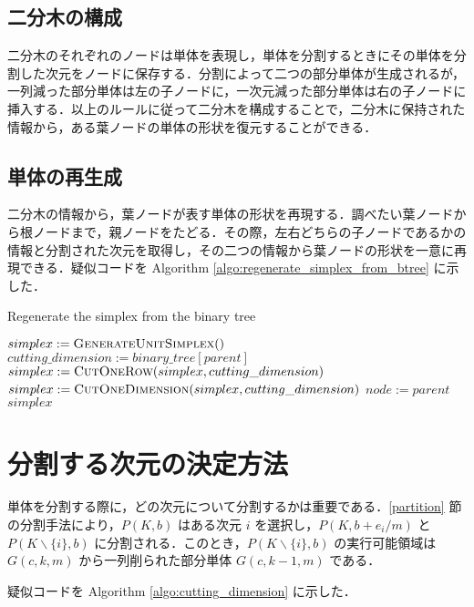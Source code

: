 \documentclass[a4paper,11pt]{jreport}
\begin{document}
\subsection{二分木の構成}

二分木のそれぞれのノードは単体を表現し，単体を分割するときにその単体を分割した次元をノードに保存する．分割によって二つの部分単体が生成されるが，一列減った部分単体は左の子ノードに，一次元減った部分単体は右の子ノードに挿入する．以上のルールに従って二分木を構成することで，二分木に保持された情報から，ある葉ノードの単体の形状を復元することができる．\par

\subsection{単体の再生成}

二分木の情報から，葉ノードが表す単体の形状を再現する．調べたい葉ノードから根ノードまで，親ノードをたどる．その際，左右どちらの子ノードであるかの情報と分割された次元を取得し，その二つの情報から葉ノードの形状を一意に再現できる．疑似コードを Algorithm \ref{algo:regenerate_simplex_from_btree} に示した．\par

\begin{algorithm}
\caption{Regenerate the simplex from the binary tree}
\label{algo:regenerate_simplex_from_btree}
\begin{algorithmic}[1]
\State $ simplex := \Call{GenerateUnitSimplex} $
\State $ cutting\_dimension := binary\_tree[parent] $
\State $ simplex := \Call{CutOneRow}{simplex, cutting\_dimension} $
\State $ simplex := \Call{CutOneDimension}{simplex,  cutting\_dimension} $
\EndIf
\State $ node := parent $
\EndWhile
\State \Return $ simplex $
\EndFunction
\end{algorithmic}
\end{algorithm}

\section{分割する次元の決定方法}

単体を分割する際に，どの次元について分割するかは重要である．\ref{partition} 節の分割手法により，$ P(K, b) $ はある次元 $ i $ を選択し，$ P(K, b + e_{i} / m) $ と $ P(K \backslash \{i\}, b) $ に分割される．このとき，$ P(K \backslash \{i\}, b) $ の実行可能領域は $ G(c, k, m) $ から一列削られた部分単体 $ G(c, k - 1, m) $ である．\par
疑似コードを Algorithm \ref{algo:cutting_dimension} に示した．\par
\end{document}
